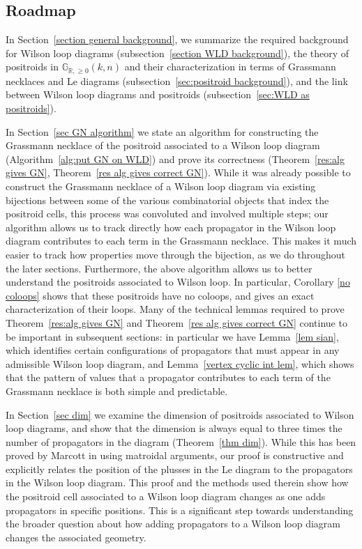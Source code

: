 \documentclass[11pt]{article}
\newcommand{\R}{\mathbb{R}}
\newcommand{\Gr}{\mathbb{G}_{\R, \geq 0}}
\theoremstyle{remark}
\theoremstyle{definition}
\begin{document}
\subsection{Roadmap}

In Section~\ref{section general background}, we summarize the required background for Wilson loop diagrams (subsection~\ref{section WLD background}), the theory of positroids in $\Gr(k,n)$ and their characterization in terms of Grassmann necklaces and Le diagrams (subsection~\ref{sec:positroid background}), and the link between Wilson loop diagrams and positroids (subsection~\ref{sec:WLD as positroids}). 

In Section~\ref{sec GN algorithm} we state an algorithm for constructing the Grassmann necklace of the positroid associated to a Wilson loop diagram (Algorithm~\ref{alg:put GN on WLD}) and prove its correctness (Theorem~\ref{res:alg gives GN}, Theorem~\ref{res alg gives correct GN}). While it was already possible to construct the Grassmann necklace of a Wilson loop diagram via existing bijections between some of the various combinatorial objects that index the positroid cells, this process was convoluted and involved multiple steps; our algorithm allows us to track directly how each propagator in the Wilson loop diagram contributes to each term in the Grassmann necklace. This makes it much easier to track how properties move through the bijection, as we do throughout the later sections. Furthermore, the above algorithm allows us to better understand the positroids associated to Wilson loop. In particular, Corollary \ref{no coloops} shows that these positroids have no coloops, and gives an exact characterization of their loops. Many of the technical lemmas required to prove Theorem~\ref{res:alg gives GN} and Theorem~\ref{res alg gives correct GN} continue to be important in subsequent sections: in particular we have Lemma~\ref{lem sian}, which identifies certain configurations of propagators that must appear in any admissible Wilson loop diagram, and Lemma~\ref{vertex cyclic int lem}, which shows that the pattern of values that a propagator contributes to each term of the Grassmann necklace is both simple and predictable.

In Section~\ref{sec dim} we examine the dimension of positroids associated to Wilson loop diagrams, and show that the dimension is always equal to three times the number of propagators in the diagram (Theorem~\ref{thm dim}).  While this has been proved by Marcott in \cite{WLDdim} using matroidal arguments, our proof is constructive and explicitly relates the position of the plusses in the Le diagram to the propagators in the Wilson loop diagram. This proof and the methods used therein show how the positroid cell associated to a Wilson loop diagram changes as one adds propagators in specific positions. This is a significant step towards understanding the broader question about how adding propagators to a Wilson loop diagram changes the associated geometry.
\end{document}

